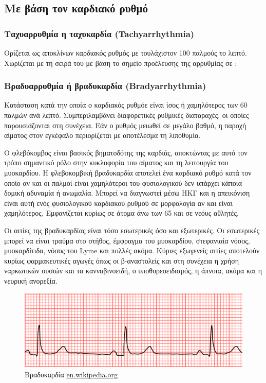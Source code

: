 \subsection{Με βάση τον καρδιακό ρυθμό}
\subsubsection{Ταχυαρρυθμία η ταχυκαρδία \en (Tachyarrhythmia)} 
Oρίζεται ως αποκλίνων καρδιακός ρυθμός με τουλάχιστον 100 παλμούς το λεπτό. Χωρίζεται με τη σειρά του με βάση το σημείο προέλευσης της αρρυθμίας σε : 

\subsubsection{Βραδυαρρυθμία ή βραδυκαρδία \en (Bradyarrhythmia) \gr}
Κατάσταση κατά την οποία ο καρδιακός ρυθμόε είναι ίσος ή χαμηλότερος των 60 παλμών ανά λεπτό. Συμπεριλαμβάνει διαφορετικές ρυθμικές διαταραχές, οι οποίες παρουσιάζονται στη συνέχεια. Εάν ο ρυθμός μειωθεί σε μεγάλο βαθμό, η παροχή αίματος στον εγκέφαλο περιορίζεται με αποτέλεσμα τη λιποθυμία.
\par
Ο φλεβόκομβος είναι βασικός βηματοδότης της καρδιάς, αποκτώντας με αυτό τον τρόπο σημαντικό ρόλο στην κυκλοφορία του αίματος και τη λειτουργία του μυοκαρδίου. Η φλεβοκομβική βραδυκαρδία αποτελεί ένα καρδιακό ρυθμό κατά τον οποίο αν και οι παλμοί είναι χαμηλότεροι του φυσιολογικού δεν υπάρχει κάποια δομική αδυναμία ή ανωμαλία. Μπορεί να διαγνωστεί μέσω ΗΚΓ και η απεικόνιση είναι αυτή ενός φυσιολογικού καρδιακού ρυθμού σε μορφολογία αν και είναι χαμηλότερος. Εμφανίζεται κυρίως σε άτομα άνω των 65 και σε νεόυς αθλητές.
\par
Οι αιτίες της βραδυκαρδίας είναι τόσο εσωτερικές όσο και εξωτερικές. Οι εσωτερικές μπορεί να είναι τραύμα στο στήθος, έμφραγμα του μυοκαρδίου, στεφανιαία νόσος, μυοκαρδίτιδα, νόσος του \en Lyme \gr και πολλές ακόμα. Κύριες εξωγενείς αιτίες αποτελούν κυρίως φαρμακευτικές αγωγές όπως οι β-αναστολείς και στη συνέχεια η χρήση ναρκωτικών ουσιών και τα κανναβινοειδή, ο υποθυρεοειδισμός, η άπνοια, ακόμα και η νευρική ανορεξία. 
\par
\begin{figure}
	\centering
	\includegraphics[scale=0.2]{bradychardia.png}
	\caption{Βραδυκαρδία \en\protect\url{en.wikipedia.org}}
\end{figure}

